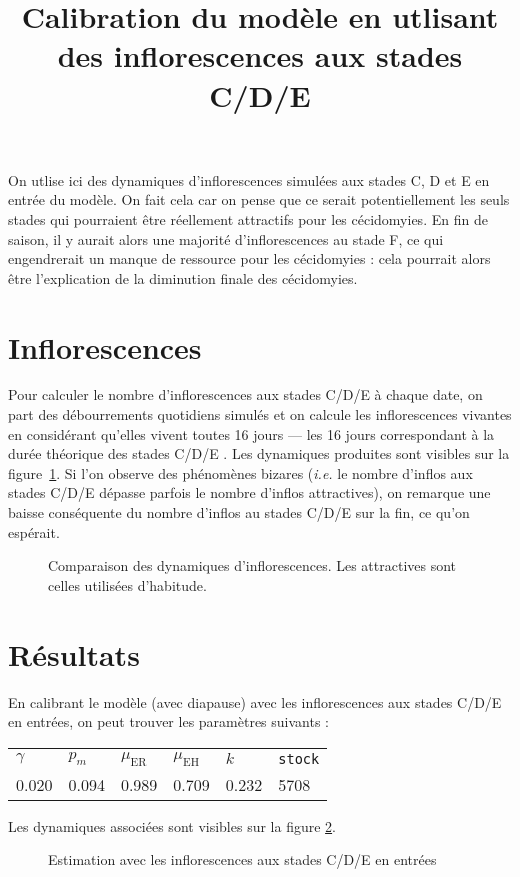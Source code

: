 \documentclass[a4paper, 11pt]{article}
\title{Calibration du modèle en utlisant des inflorescences aux stades C/D/E}
\author{}
\date{}
\begin{document}
 \maketitle
 
 On utlise ici des dynamiques d'inflorescences simulées aux stades C, D et E en entrée du modèle. On fait cela car on pense que ce serait potentiellement les seuls stades qui pourraient être réellement attractifs pour les cécidomyies. En fin de saison, il y aurait alors une majorité d'inflorescences au stade F, ce qui engendrerait un manque de ressource pour les cécidomyies : cela pourrait alors être l'explication de la diminution finale des cécidomyies.
 
 \section{Inflorescences}
 
 Pour calculer le nombre d'inflorescences aux stades C/D/E à chaque date, on part des débourrements quotidiens simulés et on calcule les inflorescences vivantes en considérant qu'elles vivent toutes 16 jours --- les 16 jours correspondant à la durée théorique des stades C/D/E \citep{laurie}.
 Les dynamiques produites sont visibles sur la figure~\ref{titi}. Si l'on observe des phénomènes bizares (\emph{i.e.} le nombre d'inflos aux stades C/D/E dépasse parfois le nombre d'inflos attractives), on remarque une baisse conséquente du nombre d'inflos au stades C/D/E sur la fin, ce qu'on espérait.
 \begin{figure}[ht]
 \centering
 \caption{Comparaison des dynamiques d'inflorescences. Les attractives sont celles utilisées d'habitude.}
 \label{titi}
 \end{figure}

 \section{Résultats}
 
 En calibrant le modèle (avec diapause) avec les inflorescences aux stades C/D/E en entrées, on peut trouver les paramètres suivants :
 \begin{center}
\begin{tabular}{llllll}
$\gamma$ & $p_m$ & $\mu_{\text{ER}}$ & $\mu_{\text{EH}}$ & $k$ & \texttt{stock}\\
0.020 & 0.094 & 0.989 & 0.709 & 0.232 & 5708
 \end{tabular}
 \end{center}

Les dynamiques associées sont visibles sur la figure \ref{tutu}.
 \begin{figure}[ht]
 \centering
 \caption{Estimation avec les inflorescences aux stades C/D/E en entrées}
 \label{tutu}
 \end{figure}

 
 \vfill
 
 
 
 
\end{document}

